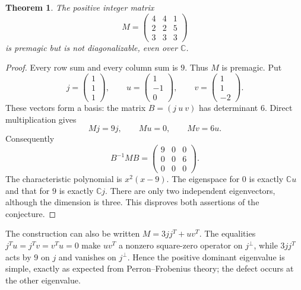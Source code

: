 \documentclass[11pt]{article}
\newtheorem{theorem}{Theorem}
\begin{document}
\begin{theorem}
The positive integer matrix
\[
 M=\begin{pmatrix}4&4&1\\2&2&5\\3&3&3\end{pmatrix}
\]
is premagic but is not diagonalizable, even over $\mathbb C$.
\end{theorem}
\begin{proof}
Every row sum and every column sum is $9$. Thus $M$ is premagic.
Put
\[
 j=\begin{pmatrix}1\\1\\1\end{pmatrix},\qquad
 u=\begin{pmatrix}1\\-1\\0\end{pmatrix},\qquad
 v=\begin{pmatrix}1\\1\\-2\end{pmatrix}.
\]
These vectors form a basis: the matrix $B=(j\ u\ v)$ has determinant
$6$. Direct multiplication gives
\[
 Mj=9j,\qquad Mu=0,\qquad Mv=6u.
\]
Consequently
\[
 B^{-1}MB=
 \begin{pmatrix}9&0&0\\0&0&6\\0&0&0\end{pmatrix}.
\]
The characteristic polynomial is $x^2(x-9)$. The eigenspace for $0$
is exactly $\mathbb C u$ and that for $9$ is exactly $\mathbb C j$.
There are only two independent eigenvectors, although the dimension
is three. This disproves both assertions of the conjecture.
\end{proof}

The construction can also be written $M=3jj^T+uv^T$.
The equalities $j^Tu=j^Tv=v^Tu=0$ make $uv^T$ a nonzero square-zero
operator on $j^\perp$, while $3jj^T$ acts by $9$ on $j$ and vanishes
on $j^\perp$. Hence the positive dominant eigenvalue is simple, exactly
as expected from Perron--Frobenius theory; the defect occurs at the
other eigenvalue.
\end{document}
